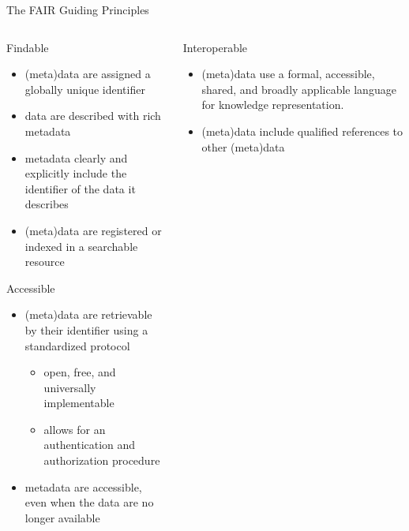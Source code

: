 \documentclass[ignorenonframetext,aspectratio=169,10pt,xcolor=table]{beamer}
\begin{document}
\begin{frame}{The FAIR Guiding Principles}
  \begin{columns} \scriptsize
    \begin{column}{0.5\textwidth}
  \begin{block}{Findable}
    \begin{itemize}
    \item (meta)data are assigned a globally unique identifier
    \item data are described with rich metadata 
    \item metadata clearly and explicitly include the identifier of the data it describes
    \item (meta)data are registered or indexed in a searchable resource
    \end{itemize}
  \end{block}

  \begin{block}{Accessible}
    \begin{itemize}
    \item (meta)data are retrievable by their identifier using a standardized protocol
      \begin{itemize} \scriptsize
      \item  open, free, and universally implementable
      \item  allows for an authentication and authorization procedure
      \end{itemize}
    \item metadata are accessible, even when the data are no longer available
    \end{itemize}
  \end{block}
\end{column}
  \begin{column}{0.5\textwidth}
  \begin{block}{Interoperable}
    \begin{itemize}
    \item (meta)data use a formal, accessible, shared, and broadly applicable language for knowledge representation.
    \item (meta)data include qualified references to other (meta)data
    \end{itemize}
  \end{block}


\end{column}
\end{columns}
\end{frame}
\end{document}
